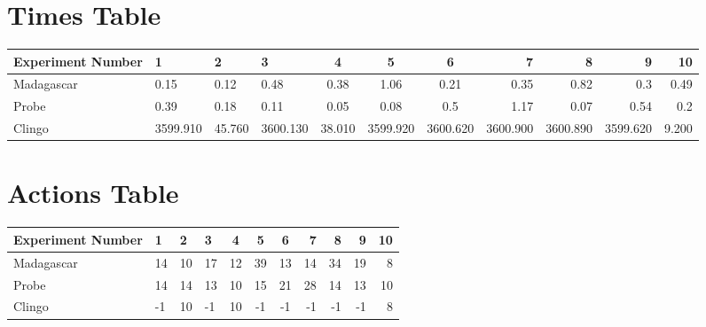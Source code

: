 \documentclass[8pt]{article}
\begin{document}
\begin{landscape}
\section{Times Table}\begin{tabular}{ | l | l | l | l | c | c | c | r | r | r | r | }\hline
Experiment Number & 1 & 2 & 3 & 4 & 5 & 6 & 7 & 8 & 9 & 10\\  \hline
Madagascar & 0.15 & 0.12 & 0.48 & 0.38 & 1.06 & 0.21 & 0.35 & 0.82 & 0.3 & 0.49\\  \hline
Probe & 0.39 & 0.18 & 0.11 & 0.05 & 0.08 & 0.5 & 1.17 & 0.07 & 0.54 & 0.2\\  \hline
Clingo & 3599.910 & 45.760 & 3600.130 & 38.010 & 3599.920 & 3600.620 & 3600.900 & 3600.890 & 3599.620 & 9.200\\  \hline
\end{tabular}
\section{Actions Table}\begin{tabular}{ | l | l | l | l | c | c | c | r | r | r | r | }\hline
Experiment Number & 1 & 2 & 3 & 4 & 5 & 6 & 7 & 8 & 9 & 10\\ \hline
 Madagascar & 14 & 10 & 17 & 12 & 39 & 13 & 14 & 34 & 19 & 8\\ \hline
 Probe & 14 & 14 & 13 & 10 & 15 & 21 & 28 & 14 & 13 & 10\\ \hline
 Clingo & -1 & 10 & -1 & 10 & -1 & -1 & -1 & -1 & -1 & 8\\ \hline
\end{tabular}
\end{landscape}
\end{document}
